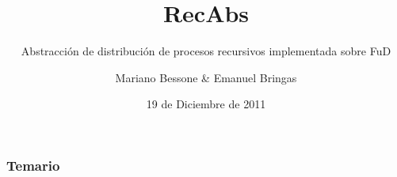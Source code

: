 \documentclass[xcolor=pdftex,hyperref={pdfpagelabels=false},table,10pt]{beamer}
\title{RecAbs}
\subtitle{Abstracción de distribución de procesos recursivos implementada sobre FuD}
\author{Mariano Bessone \& Emanuel Bringas}
\institute[UNRC]{
    
    \begin{minipage}{0.45\textwidth}
        \begin{center}
            \texttt{[image: images/unrc.jpg]}\\
            \begin{scriptsize}
                \textsc{Universidad Nacional de Río Cuarto} \\
            \end{scriptsize}
            \vfill
            \begin{tiny}
                \textsc{Fac. de Cs. Exactas, Fco-Qcas y Naturales} \\
                \textsc{Departamento de Computación} \\[1cm]
            \end{tiny}
        \end{center}
    \end{minipage}
    \begin{minipage}{0.45\textwidth}
        \begin{center}
            \texttt{[image: images/fudepan.png]}\\
            \vfill
            \begin{scriptsize}
                \textsc{FuDePAN} \\
            \end{scriptsize}
            \begin{tiny}
                \textsc{Fundación para el Desarrollo de la Programación en Ácidos Nucleicos} \\[1cm]
            \end{tiny}
        \end{center}
    \end{minipage}
}
\date{19 de Diciembre de 2011}
\begin{document}
\begin{frame}
    \titlepage
\end{frame}


\begin{frame}
    \frametitle{Temario}
    \tableofcontents
\end{frame}





\end{document}

